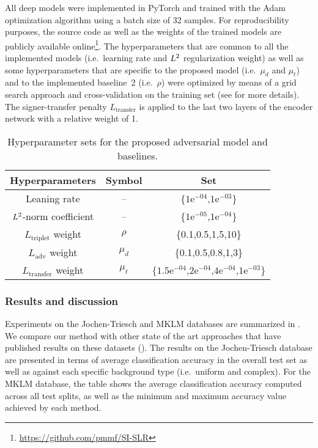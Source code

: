 All deep models were implemented in PyTorch and trained with the Adam optimization algorithm using a batch size of 32 samples. For reproducibility purposes, the source code as well as the weights of the trained models are publicly available online\footnote{\url{https://github.com/pmmf/SI-SLR}}. The hyperparameters that are common to all the implemented models (i.e.\ learning rate and $L^2$ regularization weight) as well as some hyperparameters that are specific to the proposed model (i.e.\ $\mu_d$ and $\mu_t$) and to the implemented baseline~2 (i.e.\ $\rho$) were optimized by means of a grid search approach and cross-validation on the training set (see  for more details). The signer-transfer penalty $L_{\text{transfer}}$ is applied to the last two layers of the encoder network with a relative weight of 1.

\begin{table}[t]
    \centering
    \begin{tabular}{c|c|c}
        Hyperparameters                    & Symbol & Set                \\ \hline
        Leaning rate                                & --      & \{$1\text{e}^{-04}$,$1\text{e}^{-03}$\}             \\
        $L^2$-norm coefficient                              & --       & \{$1\text{e}^{-05}$,$1\text{e}^{-04}$\}             \\
        $L_{\text{triplet}}$ weight                 & $\rho$                & \{0.1,0.5,1,5,10\}                  \\
        $L_{\text{adv}}$ weight                 & $\mu_d$                & \{0.1,0.5,0.8,1,3\}                  \\
        $L_{\text{transfer}}$ weight                 & $\mu_t$                & $\{1.5\text{e}^{-04}$,$2\text{e}^{-04}$,$4\text{e}^{-04}$,$1\text{e}^{-03}\}$
    \end{tabular}
    \caption{Hyperparameter sets for the proposed adversarial model and baselines.}
    \label{tab:hyperparam}
\end{table}

\subsubsection{Results and discussion}
Experiments on the Jochen-Triesch and MKLM databases are summarized in . We compare our method with other state of the art approaches that have published results on these datasets (\citet{Dahmani2014, Just2006, Kelly2010, Marin2014, Ferreira2018}). The results on the Jochen-Triesch database are presented in terms of average classification accuracy in the overall test set as well as against each specific background type (i.e.\ uniform and complex). For the MKLM database, the table shows the average classification accuracy computed across all test splits, as well as the minimum and maximum accuracy value achieved by each method.

